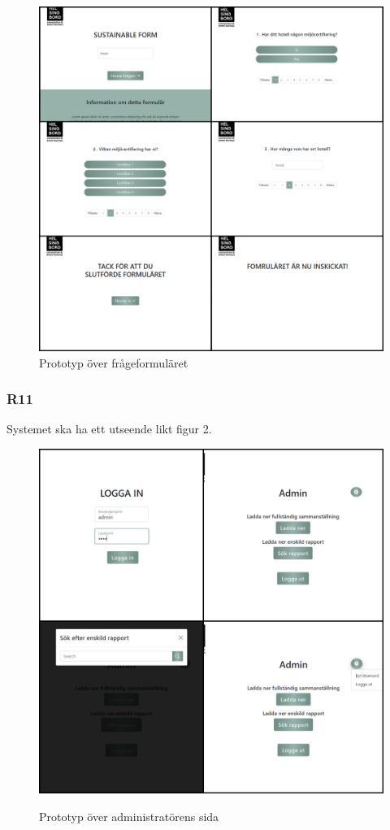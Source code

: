 \documentclass{article}
\begin{document}
    \begin{figure}[h!]
    \caption{Prototyp över frågeformuläret}
    \includegraphics[width=140mm]{Proto-Coll-Q (1).jpg}
    \end{figure}
    \newpage
    \subsubsection*{R11}
    Systemet ska ha ett utseende likt figur 2.
    \begin{figure}[h!]
        \centering
        \caption{Prototyp över administratörens sida}
        \includegraphics[width=140mm]{Proto-Coll-A.jpg}
        \label{fig:my_label}
    \end{figure}
\end{document}
